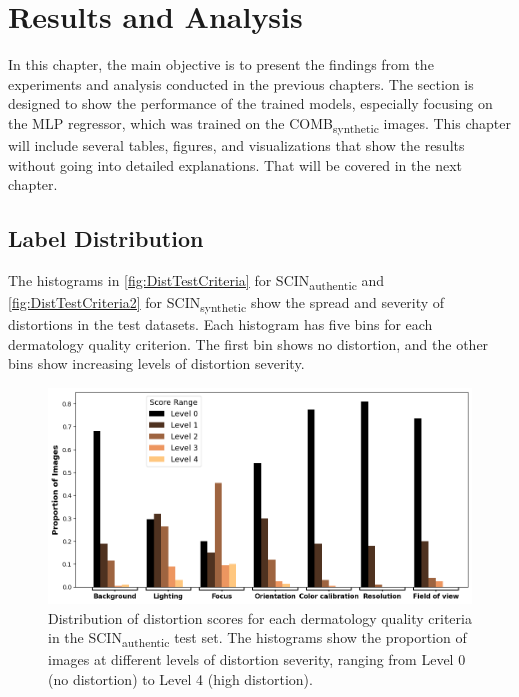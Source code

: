 \chapter{Results and Analysis}
\label{ch:ResultsAnalysis}
In this chapter, the main objective is to present the findings from the experiments and analysis conducted in the previous chapters. The section is designed to show the performance of the trained models, especially focusing on the MLP regressor, which was trained on the COMB\textsubscript{synthetic} images. This chapter will include several tables, figures, and visualizations that show the results without going into detailed explanations. That will be covered in the next chapter. \par

\section{Label Distribution}
\label{sec:LabelDist}
The histograms in \autoref{fig:DistTestCriteria} for SCIN\textsubscript{authentic} and \autoref{fig:DistTestCriteria2} for SCIN\textsubscript{synthetic} show the spread and severity of distortions in the test datasets. Each histogram has five bins for each dermatology quality criterion. The first bin shows no distortion, and the other bins show increasing levels of distortion severity. \par
\begin{figure}[ht]
    \centering
    \includegraphics[keepaspectratio,width=15cm]{img/Distribution_test_criteria.png}
    \caption{Distribution of distortion scores for each dermatology quality criteria in the SCIN\textsubscript{authentic} test set. The histograms show the proportion of images at different levels of distortion severity, ranging from Level 0 (no distortion) to Level 4 (high distortion).}
    \label{fig:DistTestCriteria}
\end{figure}
